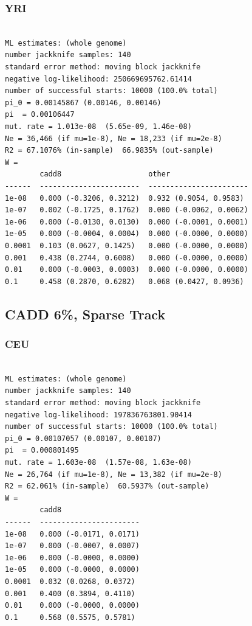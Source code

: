 \documentclass[11pt]{article}
\begin{document}
\subsubsection*{YRI}
\begin{minipage}{\linewidth}\begin{footnotesize}
\begin{verbatim}

ML estimates: (whole genome)
number jackknife samples: 140
standard error method: moving block jackknife
negative log-likelihood: 250669695762.61414
number of successful starts: 10000 (100.0% total)
pi_0 = 0.00145867 (0.00146, 0.00146)
pi  = 0.00106447
mut. rate = 1.013e-08  (5.65e-09, 1.46e-08)
Ne = 36,466 (if mu=1e-8), Ne = 18,233 (if mu=2e-8)
R2 = 67.1076% (in-sample)  66.9835% (out-sample)
W = 
        cadd8                    other
------  -----------------------  -----------------------
1e-08   0.000 (-0.3206, 0.3212)  0.932 (0.9054, 0.9583)
1e-07   0.002 (-0.1725, 0.1762)  0.000 (-0.0062, 0.0062)
1e-06   0.000 (-0.0130, 0.0130)  0.000 (-0.0001, 0.0001)
1e-05   0.000 (-0.0004, 0.0004)  0.000 (-0.0000, 0.0000)
0.0001  0.103 (0.0627, 0.1425)   0.000 (-0.0000, 0.0000)
0.001   0.438 (0.2744, 0.6008)   0.000 (-0.0000, 0.0000)
0.01    0.000 (-0.0003, 0.0003)  0.000 (-0.0000, 0.0000)
0.1     0.458 (0.2870, 0.6282)   0.068 (0.0427, 0.0936)
\end{verbatim}
\end{footnotesize}\end{minipage}


\subsection{CADD 6\%, Sparse Track}
\subsubsection*{CEU}
\begin{minipage}{\linewidth}\begin{footnotesize}
\begin{verbatim}

ML estimates: (whole genome)
number jackknife samples: 140
standard error method: moving block jackknife
negative log-likelihood: 197836763801.90414
number of successful starts: 10000 (100.0% total)
pi_0 = 0.00107057 (0.00107, 0.00107)
pi  = 0.000801495
mut. rate = 1.603e-08  (1.57e-08, 1.63e-08)
Ne = 26,764 (if mu=1e-8), Ne = 13,382 (if mu=2e-8)
R2 = 62.061% (in-sample)  60.5937% (out-sample)
W = 
        cadd8
------  -----------------------
1e-08   0.000 (-0.0171, 0.0171)
1e-07   0.000 (-0.0007, 0.0007)
1e-06   0.000 (-0.0000, 0.0000)
1e-05   0.000 (-0.0000, 0.0000)
0.0001  0.032 (0.0268, 0.0372)
0.001   0.400 (0.3894, 0.4110)
0.01    0.000 (-0.0000, 0.0000)
0.1     0.568 (0.5575, 0.5781)
\end{verbatim}
\end{footnotesize}\end{minipage}
\end{document}
